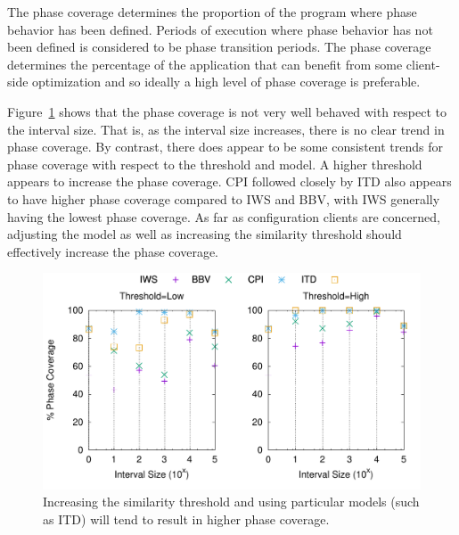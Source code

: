 The phase coverage determines the proportion of the program where phase behavior has been defined. Periods of execution where phase behavior has not been defined is considered to be phase transition periods. The phase coverage determines the percentage of the application that can benefit from some client-side optimization and so ideally a high level of phase coverage is preferable. 

Figure~\ref{fig:phasecycles} shows that the phase coverage is not very well behaved with respect to the interval size. That is, as the interval size increases, there is no clear trend in phase coverage. By contrast, there does appear to be some consistent trends for phase coverage with respect to the threshold and model. A higher threshold appears to increase the phase coverage. CPI followed closely by ITD also appears to have higher phase coverage compared to IWS and BBV, with IWS generally having the lowest phase coverage. As far as configuration clients are concerned, adjusting the model as well as increasing the similarity threshold should effectively increase the phase coverage.

\begin{figure}[htbp]
  \begin{center}
\includegraphics[width=0.99\columnwidth]{figs/phasecyclesthreshold}
  \end{center}
  \caption{Increasing the similarity threshold and using particular models (such as ITD) will tend to result in higher phase coverage.}
  \label{fig:phasecycles}
\end{figure}
